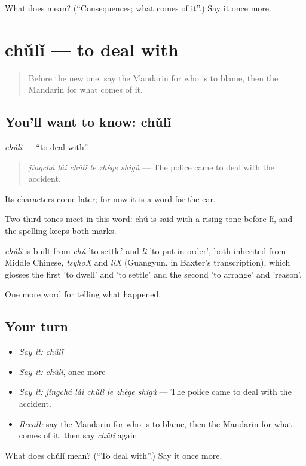 \begin{tcolorbox}[breakable,colback=teal!4,colframe=teal!35!black,title={Before you move on}]
What does  mean? (\textquotedblleft{}Consequences; what comes of it\textquotedblright{}.) Say it once more.
\end{tcolorbox}
\section[chǔlǐ]{chǔlǐ — to deal with}

\label{lesson:ZH-C297-chuli}



\begin{quote}
Before the new one: say the Mandarin for who is to blame, then the Mandarin for what comes of it.
\end{quote}

\subsection*{You'll want to know: chǔlǐ}
\emph{chǔlǐ} — \textquotedblleft{}to deal with\textquotedblright{}.

\begin{quote}
\emph{jǐngchá lái chǔlǐ le zhège shìgù} — The police came to deal with the accident.
\end{quote}

Its characters come later; for now it is a word for the ear.

Two third tones meet in this word: chǔ is said with a rising tone before lǐ, and the spelling keeps both marks.

\begin{cousinweb}
\emph{chǔlǐ} is built from \emph{chǔ} 'to settle' and \emph{lǐ} 'to put in order', both inherited from Middle Chinese, \emph{tsyhoX} and \emph{liX} (Guangyun, in Baxter's transcription), which glosses the first 'to dwell' and 'to settle' and the second 'to arrange' and 'reason'.
\end{cousinweb}

\begin{grammarlens}[title={What you've built}]
One more word for telling what happened.
\end{grammarlens}

\subsection*{Your turn}
\begin{itemize}
\raggedright
  \item \emph{Say it:} \emph{chǔlǐ}
  \item \emph{Say it:} \emph{chǔlǐ}, once more
  \item \emph{Say it:} \emph{jǐngchá lái chǔlǐ le zhège shìgù} — The police came to deal with the accident.
  \item \emph{Recall:} say the Mandarin for who is to blame, then the Mandarin for what comes of it, then say \emph{chǔlǐ} again
\end{itemize}

\begin{tcolorbox}[breakable,colback=teal!4,colframe=teal!35!black,title={Before you move on}]
What does chǔlǐ mean? (\textquotedblleft{}To deal with\textquotedblright{}.) Say it once more.
\end{tcolorbox}
